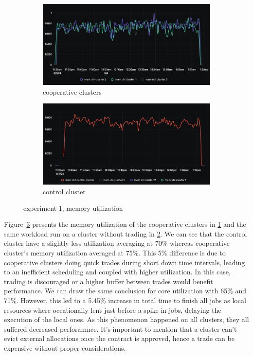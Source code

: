 \begin{figure}[H]
\centering
\begin{subfigure}{.5\textwidth}
  \centering
  \includegraphics[width=.9\linewidth]{./figures/experiment-one/cooperative-clusters-all-at-100-trading-mem-util.png}
  \caption{cooperative clusters}
  \label{fig:exp1coop}
\end{subfigure}%
\begin{subfigure}{.5\textwidth}
  \centering
  \includegraphics[width=.9\linewidth]{./figures/experiment-one/control-mem-util.png}
  \caption{control cluster}
  \label{fig:exp1control}
\end{subfigure}
\caption{experiment 1, memory utilization}
\label{fig:exp1memutil}
\end{figure}

Figure~\ref{fig:exp1memutil} presents the memory utilization of the cooperative
clusters in \ref{fig:exp1coop} and the same workload run on a cluster without
trading in \ref{fig:exp1control}.
We can see that the control cluster have a slightly less utilization averaging
at 70\% whereas cooperative cluster's memory utilization averaged at 75\%. This
5\% difference is due to cooperative clusters doing quick trades during short
down time intervals, leading to an inefficient scheduling and coupled with
higher utilization. In this case, trading is discouraged or a higher buffer
between trades would benefit performance. We can draw the same conclusion for
core utilization with 65\% and 71\%. However, this led to a 5.45\% increase in
total time to finish all jobs as local resources where occationally lent just
before a spike in jobs, delaying the execution of the local ones. As this
phenomenon happened on all clusters, they all suffered decreased perforamnce.
It's important to mention that a cluster can't evict external allocations once
the contract is approved, hence a trade can be expensive without proper
considerations.

